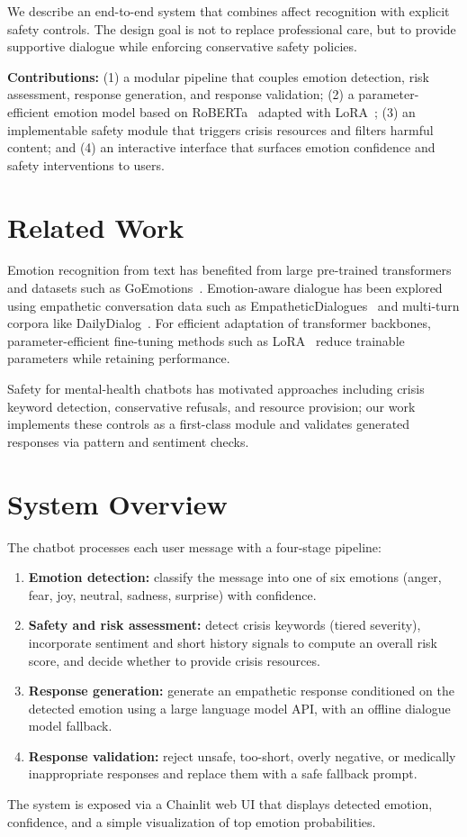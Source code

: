 \documentclass[conference]{IEEEtran}
\begin{document}
We describe an end-to-end system that combines affect recognition with explicit safety controls. The design goal is not to replace professional care, but to provide supportive dialogue while enforcing conservative safety policies.

\textbf{Contributions:} (1) a modular pipeline that couples emotion detection, risk assessment, response generation, and response validation; (2) a parameter-efficient emotion model based on RoBERTa~\cite{liu2019roberta} adapted with LoRA~\cite{hu2021lora}; (3) an implementable safety module that triggers crisis resources and filters harmful content; and (4) an interactive interface that surfaces emotion confidence and safety interventions to users.

\section{Related Work}
Emotion recognition from text has benefited from large pre-trained transformers and datasets such as GoEmotions~\cite{demszky2020goemotions}. Emotion-aware dialogue has been explored using empathetic conversation data such as EmpatheticDialogues~\cite{rashkin-etal-2019-towards} and multi-turn corpora like DailyDialog~\cite{li2017dailydialog}. For efficient adaptation of transformer backbones, parameter-efficient fine-tuning methods such as LoRA~\cite{hu2021lora} reduce trainable parameters while retaining performance.

Safety for mental-health chatbots has motivated approaches including crisis keyword detection, conservative refusals, and resource provision; our work implements these controls as a first-class module and validates generated responses via pattern and sentiment checks.

\section{System Overview}
The chatbot processes each user message with a four-stage pipeline:
\begin{enumerate}
  \item \textbf{Emotion detection:} classify the message into one of six emotions (anger, fear, joy, neutral, sadness, surprise) with confidence.
  \item \textbf{Safety and risk assessment:} detect crisis keywords (tiered severity), incorporate sentiment and short history signals to compute an overall risk score, and decide whether to provide crisis resources.
  \item \textbf{Response generation:} generate an empathetic response conditioned on the detected emotion using a large language model API, with an offline dialogue model fallback.
  \item \textbf{Response validation:} reject unsafe, too-short, overly negative, or medically inappropriate responses and replace them with a safe fallback prompt.
\end{enumerate}
The system is exposed via a Chainlit web UI that displays detected emotion, confidence, and a simple visualization of top emotion probabilities.
\end{document}
